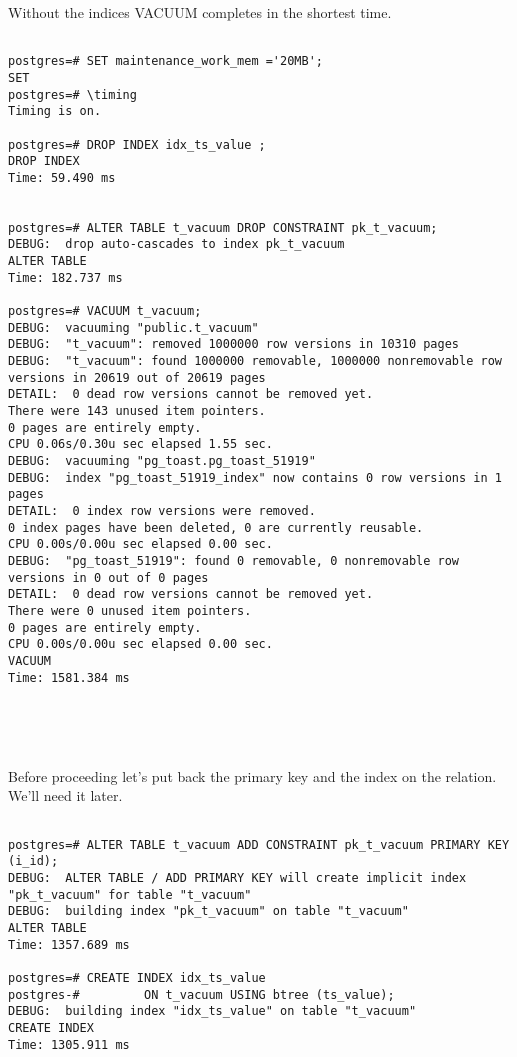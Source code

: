 Without the indices VACUUM completes in the shortest time.\newline

\begin{lstlisting}[style=pgsql]

postgres=# SET maintenance_work_mem ='20MB';
SET
postgres=# \timing
Timing is on.

postgres=# DROP INDEX idx_ts_value ;
DROP INDEX
Time: 59.490 ms


postgres=# ALTER TABLE t_vacuum DROP CONSTRAINT pk_t_vacuum;
DEBUG:  drop auto-cascades to index pk_t_vacuum
ALTER TABLE
Time: 182.737 ms

postgres=# VACUUM t_vacuum;
DEBUG:  vacuuming "public.t_vacuum"
DEBUG:  "t_vacuum": removed 1000000 row versions in 10310 pages
DEBUG:  "t_vacuum": found 1000000 removable, 1000000 nonremovable row versions in 20619 out of 20619 pages
DETAIL:  0 dead row versions cannot be removed yet.
There were 143 unused item pointers.
0 pages are entirely empty.
CPU 0.06s/0.30u sec elapsed 1.55 sec.
DEBUG:  vacuuming "pg_toast.pg_toast_51919"
DEBUG:  index "pg_toast_51919_index" now contains 0 row versions in 1 pages
DETAIL:  0 index row versions were removed.
0 index pages have been deleted, 0 are currently reusable.
CPU 0.00s/0.00u sec elapsed 0.00 sec.
DEBUG:  "pg_toast_51919": found 0 removable, 0 nonremovable row versions in 0 out of 0 pages
DETAIL:  0 dead row versions cannot be removed yet.
There were 0 unused item pointers.
0 pages are entirely empty.
CPU 0.00s/0.00u sec elapsed 0.00 sec.
VACUUM
Time: 1581.384 ms





\end{lstlisting}

Before proceeding let's put back the primary key and the index on the relation. We'll need it later.

\begin{lstlisting}[style=pgsql]

postgres=# ALTER TABLE t_vacuum ADD CONSTRAINT pk_t_vacuum PRIMARY KEY (i_id);
DEBUG:  ALTER TABLE / ADD PRIMARY KEY will create implicit index "pk_t_vacuum" for table "t_vacuum"
DEBUG:  building index "pk_t_vacuum" on table "t_vacuum"
ALTER TABLE
Time: 1357.689 ms

postgres=# CREATE INDEX idx_ts_value 
postgres-#         ON t_vacuum USING btree (ts_value);
DEBUG:  building index "idx_ts_value" on table "t_vacuum"
CREATE INDEX
Time: 1305.911 ms

\end{lstlisting}


